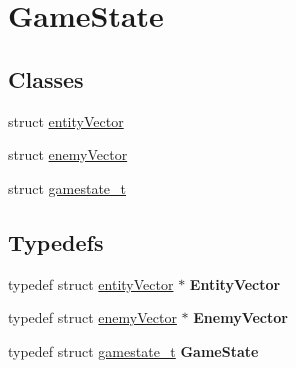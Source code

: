 \hypertarget{group__GameState}{}\section{Game\+State}
\label{group__GameState}
\subsection*{Classes}
\begin{DoxyCompactItemize}
\item 
struct \hyperlink{structentityVector}{entity\+Vector}
\item 
struct \hyperlink{structenemyVector}{enemy\+Vector}
\item 
struct \hyperlink{structgamestate__t}{gamestate\+\_\+t}
\end{DoxyCompactItemize}
\subsection*{Typedefs}
\begin{DoxyCompactItemize}
\item 
\mbox{\label{group__GameState_ga4b102ada44ccbaedfcee62e5854d0782}} 
typedef struct \hyperlink{structentityVector}{entity\+Vector} $\ast$ {\bfseries Entity\+Vector}
\item 
\mbox{\label{group__GameState_gad2cc91ce723e08f2de56f8cce91ceb4b}} 
typedef struct \hyperlink{structenemyVector}{enemy\+Vector} $\ast$ {\bfseries Enemy\+Vector}
\item 
\mbox{\label{group__GameState_gafffe4f18af78cd785ebfb107bcb88342}} 
typedef struct \hyperlink{structgamestate__t}{gamestate\+\_\+t} {\bfseries Game\+State}
\end{DoxyCompactItemize}
